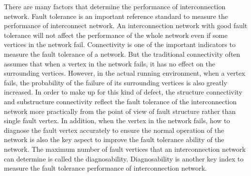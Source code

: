\begin{englishabstract}


There are many factors that determine the performance of interconnection network. Fault tolerance is an important reference standard to measure the performance of interconnect network. An interconnection network with good fault tolerance will not affect the performance of the whole network even if some vertices in the network fail. Connectivity is one of the important indicators to measure the fault tolerance of a network. But the traditional connectivity often assumes that when a vertex in the network fails, it has no effect on the surrounding vertices. However, in the actual running environment, when a vertex fails, the probability of the failure of its surrounding vertices is also greatly increased. In order to make up for this kind of defect, the structure connectivity and substructure connectivity reflect the fault tolerance of the interconnection network more practically from the point of view of fault structure rather than single fault vertex. In addition, when the vertex in the network fails, how to diagnose the fault vertex accurately to ensure the normal operation of the network is also the key aspect to improve the fault tolerance ability of the network. The maximum number of fault vertices that an interconnection network can determine is called the diagnosability. Diagnosability is another key index to measure the fault tolerance performance of interconnection network.



\end{englishabstract}
